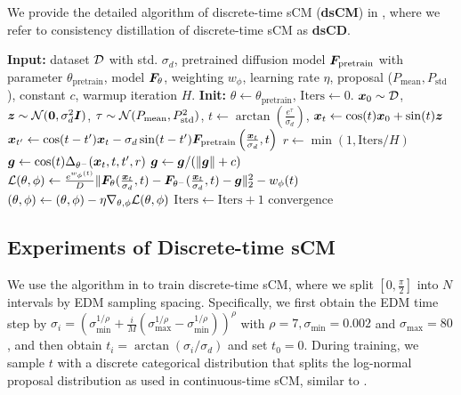 We provide the detailed algorithm of discrete-time sCM (\textbf{dsCM}) in , where we refer to consistency distillation of discrete-time sCM as \textbf{dsCD}.

\begin{algorithm}[H]
\caption{Simplified and Stabilized Discrete-time Consistency Distillation (dsCD).}\label{alg:discrete-sCM}
\centering
\begin{algorithmic}
\State \textbf{Input:} dataset ${\mathcal{D}}$ with std. $\sigma_d$, pretrained diffusion model ${\bm{F}}_{\text{pretrain}}$ with parameter $\theta_{\text{pretrain}}$, model ${\bm{F}}_\theta$, weighting $w_\phi$, learning rate $\eta$, proposal ($P_{\text{mean}}, P_{\text{std}}$), constant $c$, warmup iteration $H$.
\State \textbf{Init:} $\theta \gets \theta_{\text{pretrain}}$, $\text{Iters}\gets 0$.
\Repeat
    \State ${\bm{x}}_0\sim {\mathcal{D}}$, ${\bm{z}}\sim {\mathcal{N}}({\bm{0}},\sigma_d^2{\bm{I}})$, $\tau \sim {\mathcal{N}}(P_{\text{mean}}, P^2_{\text{std}})$, $t \gets \arctan(\frac{e^\tau}{\sigma_d})$, ${\bm{x}}_t \gets \cos(t){\bm{x}}_0 + \sin(t){\bm{z}}$
    \State ${\bm{x}}_{t'} \gets \cos(t-t'){\bm{x}}_t - \sigma_d\sin(t-t'){\bm{F}}_{\text{pretrain}} \left( \frac{{\bm{x}}_t}{\sigma_d}, t \right)$
    \State $r \gets \min(1, \text{Iters} / H)$ 
    \State ${\bm{g}} \gets \cos(t)\Delta_{\theta^-}({\bm{x}}_t,t,t',r)$  
    \State ${\bm{g}} \gets {\bm{g}} / (\|{\bm{g}}\| + c)$ 
    \State ${\mathcal{L}}(\theta,\phi) \gets \frac{e^{w_\phi(t)}}{D}\|
        {\bm{F}}_\theta(\frac{{\bm{x}}_t}{\sigma_d},t) - {\bm{F}}_{\theta^-}(\frac{{\bm{x}}_t}{\sigma_d},t)
        - {\bm{g}}
    \|_2^2 - w_\phi(t)$ 
    \State $(\theta, \phi) \gets (\theta, \phi) - \eta \nabla_{\theta,\phi}{\mathcal{L}}(\theta,\phi)$
    \State $\text{Iters}\gets \text{Iters} + 1$
\Until convergence
\end{algorithmic}
\end{algorithm}

\subsection{Experiments of Discrete-time sCM}
We use the algorithm in  to train discrete-time sCM, where we split $[0, \frac{\pi}{2}]$ into $N$ intervals by EDM sampling spacing. Specifically, we first obtain the EDM time step by $\sigma_i = (\sigma_{\text{min}}^{1/\rho} + \frac{i}{M}(\sigma_{\text{max}}^{1/\rho} - \sigma_{\text{min}}^{1/\rho}))^\rho$ with $\rho=7,\sigma_{\text{min}}=0.002$ and $\sigma_{\text{max}}=80$, and then obtain $t_i = \arctan(\sigma_i/\sigma_d)$ and set $t_0=0$. During training, we sample $t$ with a discrete categorical distribution that splits the log-normal proposal distribution as used in continuous-time sCM, similar to \citet{song2023ict}. 

